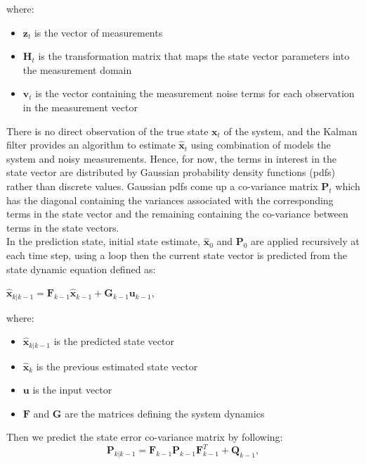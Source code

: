 \hspace{0.5cm}where:
\begin{itemize}
    \item $\textbf{z}_t$ is the vector of measurements
    \item $\textbf{H}_t$ is the transformation matrix that maps the state vector parameters into the measurement domain
    \item $\textbf{v}_t$ is the vector containing the measurement noise terms for each observation in the measurement vector
\end{itemize}\par
There is no direct observation of the true state $\textbf{x}_t$ of the system, and the Kalman filter provides an algorithm to estimate $\hat{\textbf{x}}_t$ using combination of models the system and noisy measurements. Hence, for now, the terms in interest in the state vector are distributed by Gaussian probability density functions (pdfs) rather than discrete values. Gaussian pdfs come up a co-variance matrix $\textbf{P}_t$ which has the diagonal containing the variances associated with the corresponding terms in the state vector and the remaining containing the co-variance between terms in the state vectors.\\
In the prediction state, initial state estimate, $\hat{\textbf{x}}_0$ and $\textbf{P}_0$ are applied recursively at each time step, using a loop then the current state vector is predicted from the state dynamic equation defined as:
\begin{center}
    $
        \hat{\textbf{x}}_{k|k-1} = \textbf{F}_{k-1}\hat{\textbf{x}}_{k-1} + \textbf{G}_{k-1}\textbf{u}_{k-1}, 
    $
\end{center}
\hspace{0.5cm}where:
\begin{itemize}
    \item $\hat{\textbf{x}}_{k|k-1}$ is the predicted state vector
    \item $\hat{\textbf{x}}_{k}$ is the previous estimated state vector
    \item $\textbf{u}$ is the input vector
    \item $\textbf{F}$ and $\textbf{G}$ are the matrices defining the system dynamics
\end{itemize}

\hspace{0.5cm}Then we predict the state error co-variance matrix by following:
\begin{equation}
          \textbf{P}_{k|k-1} = \textbf{F}_{k-1}\textbf{P}_{k-1}\textbf{F}^T_{k-1} + \textbf{Q}_{k-1}, 
\end{equation}

